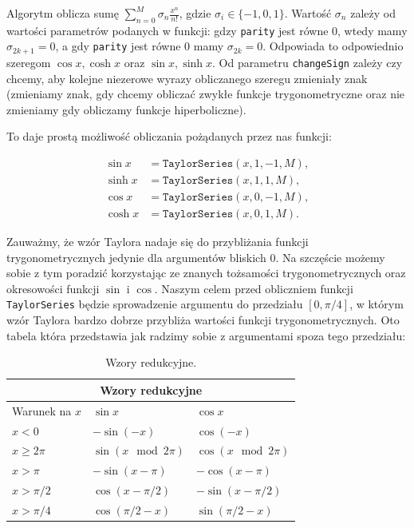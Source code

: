 \documentclass{mwart}
\theoremstyle{remark}
\theoremstyle{definition}
\theoremstyle{definition}
\begin{document}
Algorytm oblicza sumę $\sum_{n=0}^M\sigma_n\frac{x^n}{n!}$, gdzie $\sigma_i \in \{-1, 0, 1\}$. Wartość $\sigma_n$ zależy od wartości parametrów podanych w funkcji: gdzy \texttt{parity} jest równe $0$, wtedy mamy $\sigma_{2k + 1} = 0$, a gdy \texttt{parity} jest równe $0$ mamy $\sigma_{2k} = 0$. Odpowiada to odpowiednio szeregom $\cos x, \cosh x$ oraz $\sin x, \sinh x$. Od parametru \texttt{changeSign} zależy czy chcemy, aby kolejne niezerowe wyrazy obliczanego szeregu zmieniały znak (zmieniamy znak, gdy chcemy obliczać zwykłe funkcje trygonometryczne oraz nie zmieniamy gdy obliczamy funkcje hiperboliczne). 

To daje prostą możliwość obliczania pożądanych przez nas funkcji:

\begin{align*}
  \sin x  & = \texttt{TaylorSeries}(x, 1, -1, M), \\
  \sinh x & = \texttt{TaylorSeries}(x, 1, 1, M),  \\
  \cos x  & = \texttt{TaylorSeries}(x, 0, -1, M), \\
  \cosh x & = \texttt{TaylorSeries}(x, 0, 1, M).
\end{align*}

Zauważmy, że wzór Taylora nadaje się do przybliżania funkcji trygonometrycznych jedynie dla argumentów bliskich $0$. 
Na szczęście możemy sobie z tym poradzić korzystając ze znanych tożsamości trygonometrycznych oraz okresowości funkcji $\sin$ i $\cos$. 
Naszym celem przed obliczniem funkcji \texttt{TaylorSeries} będzie sprowadzenie argumentu do przedziału $[0, \pi/4]$,
w którym wzór Taylora bardzo dobrze przybliża wartości funkcji trygonometrycznych. 
Oto tabela która przedstawia jak radzimy sobie z argumentami spoza tego przedziału:
\begin{table}[H]
  \centering
  \begin{tabular}{ |p{4cm}||p{4cm}|p{4cm}| }
    \hline
    \multicolumn{3}{|c|}{Wzory redukcyjne}                     \\
    \hline
    Warunek na $x$ & $\sin x$            & $\cos x$            \\
    \hline
    $x < 0$        & $-\sin (-x)$        & $\cos (-x)$         \\
    $x \ge 2\pi$   & $\sin(x \mod 2\pi)$ & $\cos (x\mod 2\pi)$ \\
    $x > \pi$      & $-\sin(x - \pi)$    & $-\cos(x - \pi)$    \\
    $x > \pi/2$    & $\cos(x - \pi/2)$   & $-\sin(x - \pi/2)$  \\
    $x > \pi/4$    & $\cos(\pi/2 - x)$   & $\sin(\pi/2 - x)$   \\
    \hline
  \end{tabular}
  \caption{Wzory redukcyjne.}
  \label{tab:reduk}
\end{table}
\end{document}
